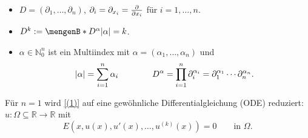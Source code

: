 \begin{notation}
\begin{itemize}
	\item $D = (\partial_1, \dots , \partial_n)$, $\partial_i = \partial_{x_i} = \frac{{\partial }}{{\partial x_i}} $ für $i=1,\dots,n$.
	\item $D^k:= \set[D^{\alpha }]{\abs{\alpha }=k}$.
	\item $\alpha \in \mathbb{N}_0^n$ ist ein Multiindex mit $\alpha = (\alpha_1, \dots, \alpha_n)$ und
	\[
		\lvert\alpha\rvert = \sum^{n}_{i=1}\alpha_i \qquad \qquad D^{\alpha}= \prod\limits_{i=1}^{n}\partial_i^{\alpha_i} 
		= \partial_1^{\alpha_1} \cdots \partial_n^{\alpha_n}.
	\]
\end{itemize}
\end{notation}

\begin{bemerkung}
Für $n=1$ wird \eqref{(1)} auf eine gewöhnliche Differentialgleichung (ODE) reduziert: $u: \Omega \subseteq \mathbb{R} \to \mathbb{R}$ mit
\[
	E(x,u(x),u'(x),\dots,u^{(k)}(x))=0 \qquad \text{in } \Omega.
\]
\end{bemerkung}

